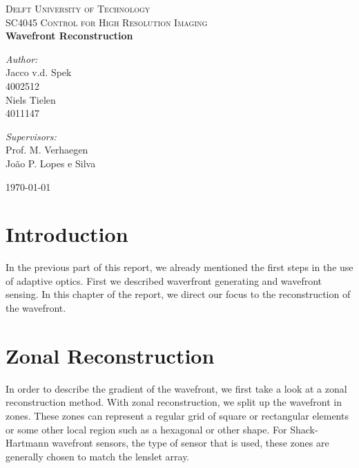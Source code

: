 \documentclass{article}
\begin{document}
\begin{titlepage}
\begin{center}

\textsc{\LARGE Delft University of Technology}\\[1.5cm]
\textsc{ SC4045 Control for High Resolution Imaging}\\[0.5cm]

{\huge\bfseries Wavefront Reconstruction \\[0.4cm] }

\begin{minipage}{0.4\textwidth}
\begin{flushleft} \large
\emph{Author:}\\
Jacco v.d. Spek \\
4002512 \\
Niels Tielen \\
4011147

\end{flushleft}
\end{minipage}
\begin{minipage}{0.4\textwidth}
\begin{flushright} \large
\emph{Supervisors:} \\
Prof. M. Verhaegen \\
João P. Lopes e Silva  
\end{flushright}
\end{minipage}

\vfill
{\large \today}
\end{center}
\end{titlepage}

\section*{Introduction}

In the previous part of this report, we already mentioned the first steps in the use of adaptive optics. First we described waverfront generating and wavefront sensing. In this chapter of the report, we direct our focus to the reconstruction of the wavefront. 

\section{Zonal Reconstruction}
In order to describe the gradient of the wavefront, we first take a look at a zonal reconstruction method. With zonal reconstruction, we split up the wavefront in zones. These zones can represent a regular grid of square or rectangular elements or some other local region such as a hexagonal or other shape. For Shack-Hartmann wavefront sensors, the type of sensor that is used, these zones are generally chosen to match the lenslet array.
\end{document}
